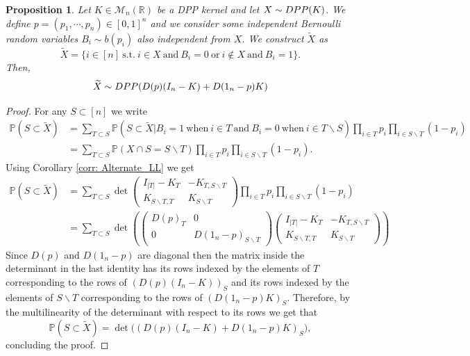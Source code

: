 \documentclass{article}
\numberwithin{equation}{section}
\renewcommand{\tilde}{\widetilde}
\newcommand{\bR}{\mathbb{R}}
\newcommand{\DPP}{\textnormal{DPP}}
\theoremstyle{plain}
\newtheorem{proposition}{Proposition}[section]
\begin{document}
\begin{proposition}\label{prop: Switching_the_values}
Let $K\in\mathcal{M}_n(\bR)$ be a DPP kernel and let $X\sim \DPP(K)$. We define $p=(p_1,\cdots,p_n)\in[0,1]^n$ and we consider some independent Bernoulli random variables $B_i\sim b(p_i)$ also independent from $X$. We construct $\tilde X$ as
\[\tilde X=\{i\in [n]~\mbox{s.t.}~i\in X~\mbox{and}~B_i=0~\mbox{or}~i\notin X~\mbox{and}~B_i=1\}.\]
Then,
\[\tilde X\sim \DPP(D(p)(I_n-K)+D(1_n-p)K)\]
\end{proposition}
\begin{proof}
For any $S\subset [n]$ we write
\begin{align*}
\mathbb{P}(S\subset \tilde X)&=\sum_{T\subset S}\mathbb{P}(S\subset \tilde X|B_i=1~\mbox{when}~i\in T~\mbox{and}~B_i=0~\mbox{when}~i\in T\backslash S)\prod_{i\in T}p_i\prod_{i\in S\backslash T}(1-p_i)\\
&=\sum_{T\subset S}\mathbb{P}(X\cap S=S\backslash T)\prod_{i\in T}p_i\prod_{i\in S\backslash T}(1-p_i).
\end{align*}
Using Corollary \ref{corr: Alternate_LL} we get
\begin{align*}
\mathbb{P}(S\subset \tilde X)&=\sum_{T\subset S}\det\begin{pmatrix} I_{|T|}-K_{T} & -K_{T, S\backslash T}\\
K_{S\backslash T, T} & K_{S\backslash T}
\end{pmatrix}\prod_{i\in T}p_i\prod_{i\in S\backslash T}(1-p_i)\\
&=\sum_{T\subset S}\det\left(\begin{pmatrix} D(p)_T & 0 \\
0 & D(1_n-p)_{S\backslash T}
\end{pmatrix}\begin{pmatrix} I_{|T|}-K_{T} & -K_{T, S\backslash T}\\
K_{S\backslash T, T} & K_{S\backslash T}
\end{pmatrix}\right)
\end{align*}
Since $D(p)$ and $D(1_n-p)$ are diagonal then the matrix inside the determinant in the last identity has its rows indexed by the elements of $T$ corresponding to the rows of $(D(p)(I_n-K))_S$ and its rows indexed by the elements of $S\backslash T$ corresponding to the rows of $(D(1_n-p)K)_S$. Therefore, by the multilinearity of the determinant with respect to its rows we get that
\[\mathbb{P}(S\subset \tilde X)=\det\big((D(p)(I_n-K)+D(1_n-p)K)_S\big),\]
concluding the proof.
\end{proof}
\end{document}
